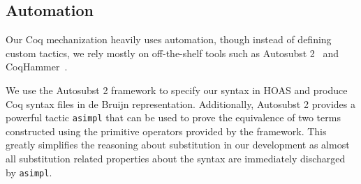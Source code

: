 \documentclass[acmsmall,screen=true,
\ifpublic review=false\else,review=true\fi
  ,anonymous=\ifanonymous true\else false\fi]{acmart}
\newcommand{\scw}[1]{}
\begin{document}


\subsection{Automation}
\label{sec:automation}
Our Coq mechanization heavily uses automation, though instead of
defining custom tactics, we rely mostly on off-the-shelf tools such as
Autosubst 2~\citep{autosubst2} and CoqHammer~\citep{czajka2018hammer}.

We use the Autosubst 2 framework to specify our syntax in HOAS and
produce Coq syntax files in de Bruijn representation. Additionally,
Autosubst 2 provides a powerful tactic \texttt{asimpl} that
can be used to prove the equivalence of two terms constructed using
the primitive operators provided by the framework. This greatly
simplifies the reasoning about substitution in our development as
almost all substitution related properties about the syntax are
immediately discharged by \texttt{asimpl}.
\end{document}
